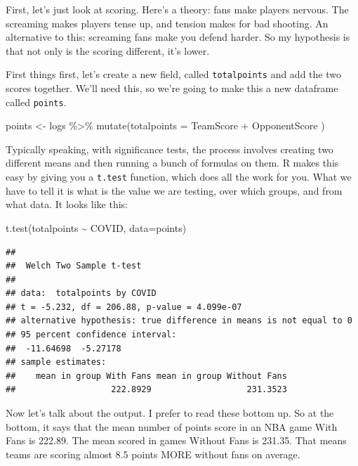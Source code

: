 \documentclass[
]{book}
\newenvironment{Shaded}{\begin{snugshade}}{\end{snugshade}}
\newcommand{\AttributeTok}[1]{\textcolor[rgb]{0.77,0.63,0.00}{#1}}
\newcommand{\FunctionTok}[1]{\textcolor[rgb]{0.00,0.00,0.00}{#1}}
\newcommand{\NormalTok}[1]{#1}
\newcommand{\OtherTok}[1]{\textcolor[rgb]{0.56,0.35,0.01}{#1}}
\newcommand{\SpecialCharTok}[1]{\textcolor[rgb]{0.00,0.00,0.00}{#1}}
\begin{document}
First, let's just look at scoring. Here's a theory: fans make players nervous. The screaming makes players tense up, and tension makes for bad shooting. An alternative to this: screaming fans make you defend harder. So my hypothesis is that not only is the scoring different, it's lower.

First things first, let's create a new field, called \texttt{totalpoints} and add the two scores together. We'll need this, so we're going to make this a new dataframe called \texttt{points}.

\begin{Shaded}
\begin{Highlighting}[]
\NormalTok{points }\OtherTok{\textless{}{-}}\NormalTok{ logs }\SpecialCharTok{\%\textgreater{}\%} \FunctionTok{mutate}\NormalTok{(}\AttributeTok{totalpoints =}\NormalTok{ TeamScore }\SpecialCharTok{+}\NormalTok{ OpponentScore )}
\end{Highlighting}
\end{Shaded}

Typically speaking, with significance tests, the process involves creating two different means and then running a bunch of formulas on them. R makes this easy by giving you a \texttt{t.test} function, which does all the work for you. What we have to tell it is what is the value we are testing, over which groups, and from what data. It looks like this:

\begin{Shaded}
\begin{Highlighting}[]
\FunctionTok{t.test}\NormalTok{(totalpoints }\SpecialCharTok{\textasciitilde{}}\NormalTok{ COVID, }\AttributeTok{data=}\NormalTok{points)}
\end{Highlighting}
\end{Shaded}

\begin{verbatim}
## 
##  Welch Two Sample t-test
## 
## data:  totalpoints by COVID
## t = -5.232, df = 206.88, p-value = 4.099e-07
## alternative hypothesis: true difference in means is not equal to 0
## 95 percent confidence interval:
##  -11.64698  -5.27178
## sample estimates:
##    mean in group With Fans mean in group Without Fans 
##                   222.8929                   231.3523
\end{verbatim}

Now let's talk about the output. I prefer to read these bottom up. So at the bottom, it says that the mean number of points score in an NBA game With Fans is 222.89. The mean scored in games Without Fans is 231.35. That means teams are scoring almost 8.5 points MORE without fans on average.
\end{document}
